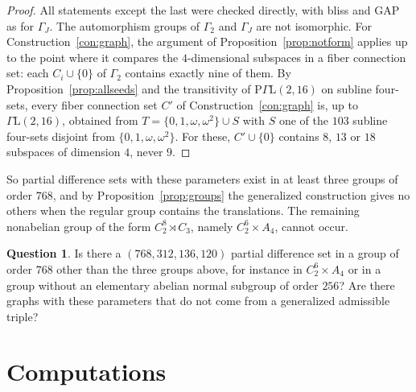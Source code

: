 \documentclass[11pt]{amsart}
\theoremstyle{definition}
\newtheorem{question}[theorem]{Question}
\begin{document}
\begin{proof}
All statements except the last were checked directly, with bliss and GAP as for $\Gamma_J$. The automorphism groups of $\Gamma_2$ and $\Gamma_J$ are not isomorphic. For Construction~\ref{con:graph}, the argument of Proposition~\ref{prop:notform} applies up to the point where it compares the $4$-dimensional subspaces in a fiber connection set: each $C_i\cup\{0\}$ of $\Gamma_2$ contains exactly nine of them. By Proposition~\ref{prop:allseeds} and the transitivity of $\mathrm{P}\Gamma\mathrm{L}(2,16)$ on subline four-sets, every fiber connection set $C'$ of Construction~\ref{con:graph} is, up to $\Gamma\mathrm{L}(2,16)$, obtained from $T=\{0,1,\omega,\omega^2\}\cup S$ with $S$ one of the $103$ subline four-sets disjoint from $\{0,1,\omega,\omega^2\}$. For these, $C'\cup\{0\}$ contains $8$, $13$ or $18$ subspaces of dimension $4$, never $9$.
\end{proof}

So partial difference sets with these parameters exist in at least three groups of order $768$, and by Proposition~\ref{prop:groups} the generalized construction gives no others when the regular group contains the translations. The remaining nonabelian group of the form $C_2^8\rtimes C_3$, namely $C_2^6\times A_4$, cannot occur.

\begin{question}
Is there a $(768,312,136,120)$ partial difference set in a group of order $768$ other than the three groups above, for instance in $C_2^6\times A_4$ or in a group without an elementary abelian normal subgroup of order $256$? Are there graphs with these parameters that do not come from a generalized admissible triple?
\end{question}

\section{Computations}\label{sec:computations}
\end{document}
